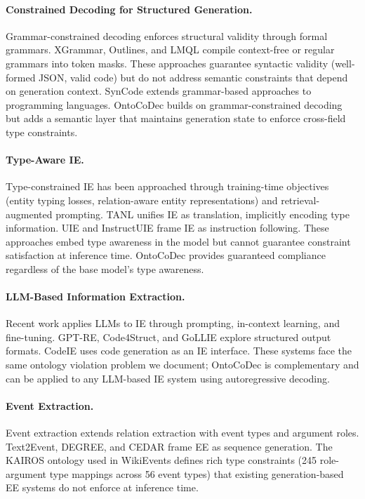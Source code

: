 \documentclass[11pt,a4paper]{article}
\newcommand{\ours}{OntoCoDec}
\begin{document}
\paragraph{Constrained Decoding for Structured Generation.}
Grammar-constrained decoding enforces structural validity through formal grammars. XGrammar, Outlines, and LMQL compile context-free or regular grammars into token masks. These approaches guarantee syntactic validity (well-formed JSON, valid code) but do not address semantic constraints that depend on generation context. SynCode extends grammar-based approaches to programming languages. \ours{} builds on grammar-constrained decoding but adds a semantic layer that maintains generation state to enforce cross-field type constraints.

\paragraph{Type-Aware IE.}
Type-constrained IE has been approached through training-time objectives (entity typing losses, relation-aware entity representations) and retrieval-augmented prompting. TANL unifies IE as translation, implicitly encoding type information. UIE and InstructUIE frame IE as instruction following. These approaches embed type awareness in the model but cannot guarantee constraint satisfaction at inference time. \ours{} provides guaranteed compliance regardless of the base model's type awareness.

\paragraph{LLM-Based Information Extraction.}
Recent work applies LLMs to IE through prompting, in-context learning, and fine-tuning. GPT-RE, Code4Struct, and GoLLIE explore structured output formats. CodeIE uses code generation as an IE interface. These systems face the same ontology violation problem we document; \ours{} is complementary and can be applied to any LLM-based IE system using autoregressive decoding.

\paragraph{Event Extraction.}
Event extraction extends relation extraction with event types and argument roles. Text2Event, DEGREE, and CEDAR frame EE as sequence generation. The KAIROS ontology used in WikiEvents defines rich type constraints (245 role-argument type mappings across 56 event types) that existing generation-based EE systems do not enforce at inference time.
\end{document}
